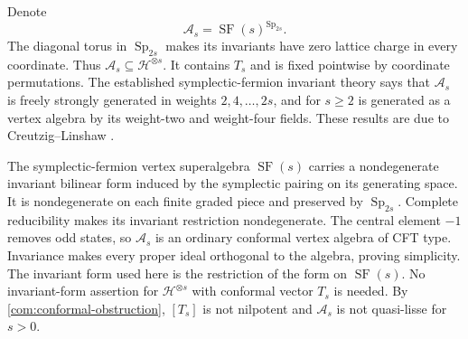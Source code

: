 \documentclass[11pt,a4paper]{amsart}
\numberwithin{equation}{section}
\theoremstyle{definition}
\theoremstyle{remark}
\newcommand{\SF}{\operatorname{SF}}
\newcommand{\Sp}{\operatorname{Sp}}
\begin{document}
Denote
\begin{equation}\label{com:sf-invariants}
                    \mathcal A_s=\SF(s)^{\Sp_{2s}}.
\end{equation}
The diagonal torus in $\Sp_{2s}$ makes its invariants have zero
lattice charge in every coordinate. Thus $\mathcal A_s\subseteq
\mathcal H^{\otimes s}$. It contains $T_s$ and is fixed
pointwise by coordinate permutations. The established
symplectic-fermion invariant theory says that $\mathcal A_s$ is freely
strongly generated in weights $2,4,\ldots,2s$, and for $s\ge2$
is generated as a vertex algebra by its weight-two and
weight-four fields. These results are due to Creutzig--Linshaw
\cite[Theorems~3.2 and~3.9, Corollary~5.7]{CLSF}.

The symplectic-fermion vertex superalgebra $\SF(s)$ carries a
nondegenerate invariant bilinear form induced by the symplectic
pairing on its generating space. It is nondegenerate on each
finite graded piece and preserved by $\Sp_{2s}$. Complete reducibility
makes its invariant restriction nondegenerate. The central element
$-1$ removes odd states, so $\mathcal A_s$ is an ordinary conformal vertex
algebra of CFT type. Invariance makes every proper ideal orthogonal
to the algebra, proving simplicity. The invariant form used here is the restriction of the form on
$\SF(s)$. No invariant-form assertion for $\mathcal H^{\otimes s}$
with conformal vector $T_s$ is needed. By
\cref{com:conformal-obstruction}, $[T_s]$ is not nilpotent and $\mathcal A_s$
is not quasi-lisse for $s>0$.
\end{document}
